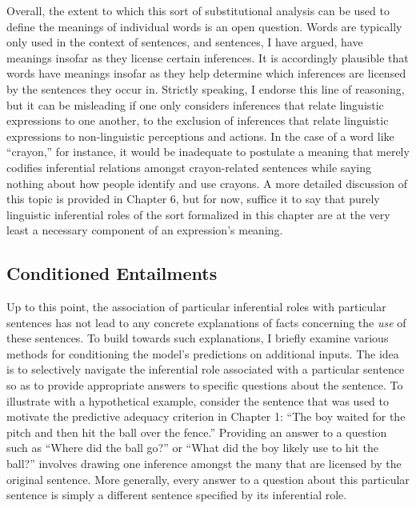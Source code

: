 Overall, the extent to which this sort of substitutional analysis can be used to define the meanings of individual words is an open question. Words are typically only used in the context of sentences, and sentences, I have argued, have meanings insofar as they license certain inferences. It is accordingly plausible that words have meanings insofar as they help determine which inferences are licensed by the sentences they occur in. Strictly speaking, I endorse this line of reasoning, but it can be misleading if one only considers inferences that relate linguistic expressions to one another, to the exclusion of inferences that relate linguistic expressions to non-linguistic perceptions and actions. In the case of a word like ``crayon,'' for instance, it would be inadequate to postulate a meaning that merely codifies inferential relations amongst crayon-related sentences while saying nothing about how people identify and use crayons. A more detailed discussion of this topic is provided in Chapter 6, but for now, suffice it to say that purely linguistic inferential roles of the sort formalized in this chapter are at the very least a necessary component of an expression's meaning.

\subsection{Conditioned Entailments}

Up to this point, the association of particular inferential roles with particular sentences has not lead to any concrete explanations of facts concerning the \textit{use} of these sentences. To build towards such explanations, I briefly examine various methods for conditioning the model's predictions on additional inputs. The idea is to selectively navigate the inferential role associated with a particular sentence so as to provide appropriate answers to specific questions about the sentence. To illustrate with a hypothetical example, consider the sentence that was used to motivate the predictive adequacy criterion in Chapter 1: ``The boy waited for the pitch and then hit the ball over the fence.'' Providing an answer to a question such as ``Where did the ball go?'' or ``What did the boy likely use to hit the ball?'' involves drawing one inference amongst the many that are licensed by the original sentence. More generally, every answer to a question about this particular sentence is simply a different sentence specified by its inferential role.

